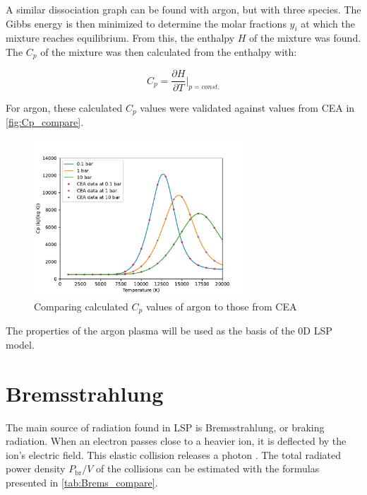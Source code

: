         A similar dissociation graph can be found with argon, but with three species. The Gibbs energy is then minimized to determine the molar fractions $y_i$ at which the mixture reaches equilibrium. From this, the enthalpy $H$ of the mixture was found. The $C_p$ of the mixture was then calculated from the enthalpy with:

        \begin{equation}
            C_p = \frac{\partial H}{\partial T}\bigg|_{p = const.}
        \end{equation}
        
        For argon, these calculated $C_p$ values were validated against values from CEA \cite{CEARUNRev4} in \autoref{fig:Cp_compare}.
        
        \begin{figure}[!ht]
            \centering
            \includegraphics[width=0.7\textwidth]{assets/2 models/Cp_compare.pdf}
            \caption{Comparing calculated $C_p$ values of argon to those from CEA}
            \label{fig:Cp_compare}
        \end{figure}

        The properties of the argon plasma will be used as the basis of the 0D LSP model.
    
    \section{Bremsstrahlung}
        
        The main source of radiation found in LSP is Bremsstrahlung, or braking radiation. When an electron passes close to a heavier ion, it is deflected by the ion's electric field. This elastic collision releases a photon \autocite{glasstoneControlledThermonuclearReactions1975}. The total radiated power density $P_\mathrm{br}/V$ of the collisions can be estimated with the formulas presented in \autoref{tab:Brems_compare}.

